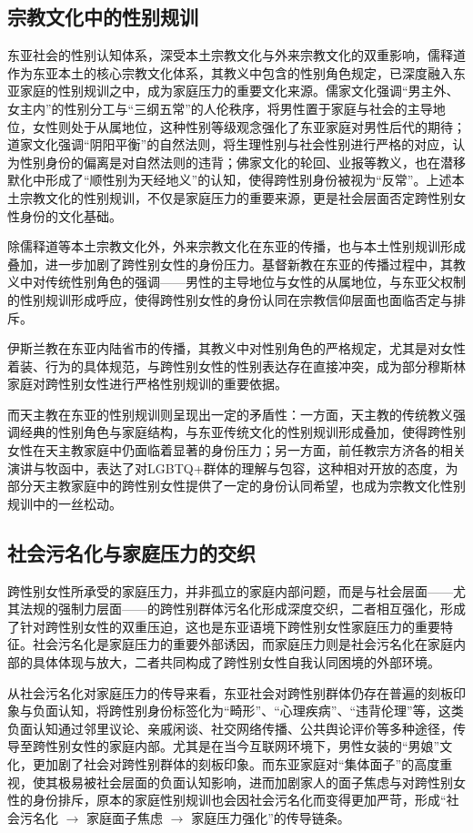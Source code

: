 \documentclass[twocolumn]{ctexart}
\begin{document}
\subsection {宗教文化中的性别规训}
东亚社会的性别认知体系，深受本土宗教文化与外来宗教文化的双重影响，儒释道作为东亚本土的核心宗教文化体系，其教义中包含的性别角色规定，已深度融入东亚家庭的性别规训之中，成为家庭压力的重要文化来源。儒家文化强调“男主外、女主内”的性别分工与“三纲五常”的人伦秩序，将男性置于家庭与社会的主导地位，女性则处于从属地位，这种性别等级观念强化了东亚家庭对男性后代的期待；道家文化强调“阴阳平衡”的自然法则，将生理性别与社会性别进行严格的对应，认为性别身份的偏离是对自然法则的违背；佛家文化的轮回、业报等教义，也在潜移默化中形成了“顺性别为天经地义”的认知，使得跨性别身份被视为“反常”。上述本土宗教文化的性别规训，不仅是家庭压力的重要来源，更是社会层面否定跨性别女性身份的文化基础。

除儒释道等本土宗教文化外，外来宗教文化在东亚的传播，也与本土性别规训形成叠加，进一步加剧了跨性别女性的身份压力。基督新教在东亚的传播过程中，其教义中对传统性别角色的强调——男性的主导地位与女性的从属地位，与东亚父权制的性别规训形成呼应，使得跨性别女性的身份认同在宗教信仰层面也面临否定与排斥。

伊斯兰教在东亚内陆省市的传播，其教义中对性别角色的严格规定，尤其是对女性着装、行为的具体规范，与跨性别女性的性别表达存在直接冲突，成为部分穆斯林家庭对跨性别女性进行严格性别规训的重要依据。

而天主教在东亚的性别规训则呈现出一定的矛盾性：一方面，天主教的传统教义强调经典的性别角色与家庭结构，与东亚传统文化的性别规训形成叠加，使得跨性别女性在天主教家庭中仍面临着显著的身份压力；另一方面，前任教宗方济各的相关演讲与牧函中，表达了对LGBTQ+群体的理解与包容，这种相对开放的态度，为部分天主教家庭中的跨性别女性提供了一定的身份认同希望，也成为宗教文化性别规训中的一丝松动。

\subsection {社会污名化与家庭压力的交织}
跨性别女性所承受的家庭压力，并非孤立的家庭内部问题，而是与社会层面——尤其法规的强制力层面——的跨性别群体污名化形成深度交织，二者相互强化，形成了针对跨性别女性的双重压迫，这也是东亚语境下跨性别女性家庭压力的重要特征\cite{lgbtlaw2009chinastatus}。社会污名化是家庭压力的重要外部诱因，而家庭压力则是社会污名化在家庭内部的具体体现与放大，二者共同构成了跨性别女性自我认同困境的外部环境。

从社会污名化对家庭压力的传导来看，东亚社会对跨性别群体仍存在普遍的刻板印象与负面认知，将跨性别身份标签化为“畸形”、“心理疾病”、“违背伦理”等，这类负面认知通过邻里议论、亲戚闲谈、社交网络传播、公共舆论评价等多种途径，传导至跨性别女性的家庭内部\cite{Li2012transgender}。尤其是在当今互联网环境下，男性女装的“男娘”文化，更加剧了社会对跨性别群体的刻板印象。而东亚家庭对“集体面子”的高度重视，使其极易被社会层面的负面认知影响，进而加剧家人的面子焦虑与对跨性别女性的身份排斥，原本的家庭性别规训也会因社会污名化而变得更加严苛，形成“社会污名化 $\rightarrow$ 家庭面子焦虑 $\rightarrow$ 家庭压力强化”的传导链条。
\end{document}
